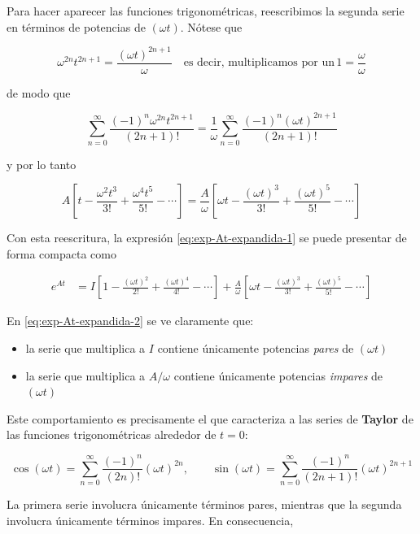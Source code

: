 \documentclass{article}
\begin{document}
Para hacer aparecer las funciones trigonométricas, reescribimos la segunda serie
en términos de potencias de $(\omega t)$. Nótese que

\[
\omega^{2n} t^{2n+1}
= \frac{(\omega t)^{2n+1}}{\omega} \quad \text{es decir, multiplicamos por un}\, 1 = \frac{\omega}{\omega}
\]

de modo que

\[
\sum_{n=0}^{\infty}
\frac{(-1)^{n}\omega^{2n} t^{2n+1}}{(2n+1)!}
=
\frac{1}{\omega}
\sum_{n=0}^{\infty}
\frac{(-1)^{n}(\omega t)^{2n+1}}{(2n+1)!}
\]

y por lo tanto

\[
A\left[
t
- \frac{\omega^{2} t^{3}}{3!}
+ \frac{\omega^{4} t^{5}}{5!}
- \cdots
\right]
=
\frac{A}{\omega}
\left[
\omega t
- \frac{(\omega t)^{3}}{3!}
+ \frac{(\omega t)^{5}}{5!}
- \cdots
\right]
\]

Con esta reescritura, la expresión \eqref{eq:exp-At-expandida-1} se puede
presentar de forma compacta como

\begin{equation}
\begin{split}
e^{At}
&=
I\left[
1 - \frac{(\omega t)^{2}}{2!}
  + \frac{(\omega t)^{4}}{4!}
  - \cdots
\right]
+
\frac{A}{\omega}
\left[
\omega t
- \frac{(\omega t)^{3}}{3!}
+ \frac{(\omega t)^{5}}{5!}
- \cdots
\right]
\end{split}
\label{eq:exp-At-expandida-2}
\end{equation}

En \eqref{eq:exp-At-expandida-2} se ve claramente que:

\begin{itemize}
  \item[$\bullet$] la serie que multiplica a $I$ contiene únicamente potencias
  \emph{pares} de $(\omega t)$
  \item[$\bullet$] la serie que multiplica a $A/\omega$ contiene únicamente potencias
  \emph{impares} de $(\omega t)$
\end{itemize}

Este comportamiento es precisamente el que caracteriza a las series de
\textbf{Taylor} de las funciones trigonométricas alrededor de $t=0$:

\begin{equation}
\cos(\omega t) =
\sum_{n=0}^{\infty} \frac{(-1)^{n}}{(2n)!}(\omega t)^{2n},
\qquad
\sin(\omega t) =
\sum_{n=0}^{\infty} \frac{(-1)^{n}}{(2n+1)!}(\omega t)^{2n+1}
\end{equation}

La primera serie involucra únicamente términos pares, mientras que la segunda
involucra únicamente términos impares. En consecuencia,
\end{document}
